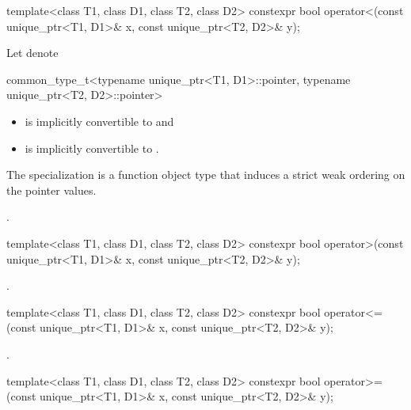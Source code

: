 %
\begin{itemdecl}
template<class T1, class D1, class T2, class D2>
  constexpr bool operator<(const unique_ptr<T1, D1>& x, const unique_ptr<T2, D2>& y);
\end{itemdecl}

\begin{itemdescr}
\pnum
Let  denote
\begin{codeblock}
common_type_t<typename unique_ptr<T1, D1>::pointer,
              typename unique_ptr<T2, D2>::pointer>
\end{codeblock}

\pnum
\mandates
\begin{itemize}
\item {} is implicitly convertible to  and
\item {} is implicitly convertible to .
\end{itemize}

\pnum
\expects
The specialization
 is a function object type that
induces a strict weak ordering on the pointer values.

\pnum
\returns
{}.
\end{itemdescr}

%
\begin{itemdecl}
template<class T1, class D1, class T2, class D2>
  constexpr bool operator>(const unique_ptr<T1, D1>& x, const unique_ptr<T2, D2>& y);
\end{itemdecl}

\begin{itemdescr}
\pnum
\returns
{}.
\end{itemdescr}

%
\begin{itemdecl}
template<class T1, class D1, class T2, class D2>
  constexpr bool operator<=(const unique_ptr<T1, D1>& x, const unique_ptr<T2, D2>& y);
\end{itemdecl}

\begin{itemdescr}
\pnum
\returns
{}.
\end{itemdescr}

%
\begin{itemdecl}
template<class T1, class D1, class T2, class D2>
  constexpr bool operator>=(const unique_ptr<T1, D1>& x, const unique_ptr<T2, D2>& y);
\end{itemdecl}

